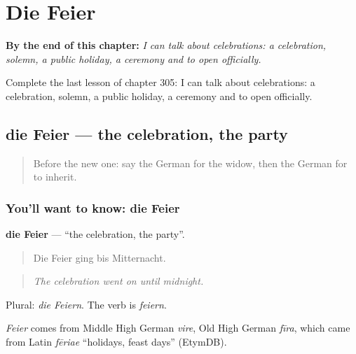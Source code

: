 
\chapter{Die Feier}
\label{ch:ge-die-feier}

\begin{chapteropening}
\textbf{By the end of this chapter:} \emph{I can talk about celebrations: a celebration, solemn, a public holiday, a ceremony and to open officially.}

Complete the last lesson of chapter 305: I can talk about celebrations: a celebration, solemn, a public holiday, a ceremony and to open officially.
\end{chapteropening}

\section[die Feier]{die Feier — the celebration, the party}

\label{lesson:GE-C305-feier}



\begin{quote}
Before the new one: say the German for the widow, then the German for to inherit.
\end{quote}

\subsection*{You'll want to know: die Feier}
\textbf{die Feier} — \textquotedblleft{}the celebration, the party\textquotedblright{}.

\begin{quote}
Die Feier ging bis Mitternacht.
\end{quote}

\begin{quote}
\emph{The celebration went on until midnight.}
\end{quote}

Plural: \emph{die Feiern}. The verb is \emph{feiern}.

\begin{cousinweb}
\emph{Feier} comes from Middle High German \emph{vire}, Old High German \emph{fīra}, which came from Latin \emph{fēriae} \textquotedblleft{}holidays, feast days\textquotedblright{} (EtymDB).
\end{cousinweb}

